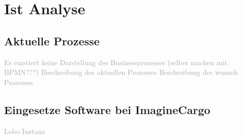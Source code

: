 \chapter{Ist Analyse}
\label{sec:istanalyse}

\section{Aktuelle Prozesse}
\textcolor{darkgray}{
  Es existiert keine Darstellung des Businessprozesses (selber machen mit BPMN???)
  Beschreibung des aktuellen Prozesses
  Beschreibung des wunsch Prozesses
}
\section{Eingesetze Software bei ImagineCargo}
\textcolor{darkgray}{
  Lobo Instanz
}
